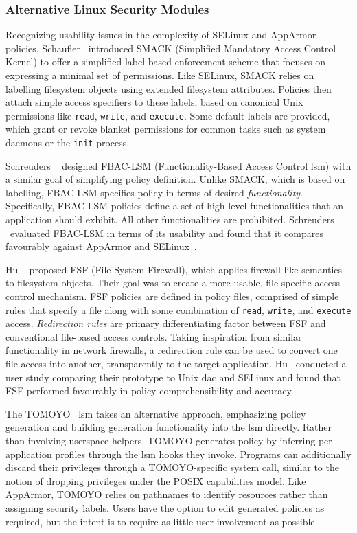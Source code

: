 \documentclass[
  fontsize=12pt,
  titlepage=firstiscover,
  paper=letter,
oneside,
  cleardoublepage=plain,
  parskip=half-,
  DIV=10,
  parindent,
  appendixprefix,
  chapterprefix,
  listof=totoc,
]{scrbook}
\begin{document}
\subsubsection*{Alternative Linux Security Modules}

Recognizing usability issues in the complexity of SELinux and AppArmor policies,
Schaufler~\cite{schaufler_smack} introduced SMACK (Simplified Mandatory Access Control
Kernel) to offer a simplified label-based enforcement scheme that focuses on expressing
a minimal set of permissions. Like SELinux, SMACK relies on labelling filesystem objects
using extended filesystem attributes. Policies then attach simple access specifiers to
these labels, based on canonical Unix permissions like \texttt{read}, \texttt{write}, and
\texttt{execute}. Some default labels are provided, which grant or revoke blanket
permissions for common tasks such as system daemons or the \texttt{init} process.

Schreuders \etal~\cite{schreuders2012_towards} designed FBAC-LSM (Functionality-Based
Access Control \gls{lsm}) with a similar goal of simplifying policy definition. Unlike
SMACK, which is based on labelling, FBAC-LSM specifies policy in terms of desired
\textit{functionality}. Specifically, FBAC-LSM policies define a set of high-level
functionalities that an application should exhibit. All other functionalities are
prohibited. Schreuders \etal~evaluated FBAC-LSM in terms of its usability and found that
it compares favourably against AppArmor and SELinux~\cite{schreuders2012_towards}.

Hu \etal~\cite{hu2013_fsf} proposed FSF (File System Firewall), which applies
firewall-like semantics to filesystem objects. Their goal was to create a more usable,
file-specific access control mechanism. FSF policies are defined in policy files,
comprised of simple rules that specify a file along with some combination of
\texttt{read}, \texttt{write}, and \texttt{execute} access. \textit{Redirection rules} are
primary differentiating factor between FSF and conventional file-based access controls.
Taking inspiration from similar functionality in network firewalls, a redirection rule can
be used to convert one file access into another, transparently to the target application.
Hu \etal~conducted a user study comparing their prototype to Unix \gls{dac} and SELinux
and found that FSF performed favourably in policy comprehensibility and accuracy.

The TOMOYO~\cite{harada2004_tomoyo} \gls{lsm} takes an alternative approach, emphasizing
policy generation and building generation functionality into the \gls{lsm} directly.
Rather than involving userspace helpers, TOMOYO generates policy by inferring
per-application profiles through the \gls{lsm} hooks they invoke. Programs can
additionally discard their privileges through a TOMOYO-specific system call, similar to
the notion of dropping privileges under the POSIX capabilities model. Like AppArmor,
TOMOYO relies on pathnames to identify resources rather than assigning security labels.
Users have the option to edit generated policies as required, but the intent is to require
as little user involvement as possible~\cite{harada2004_tomoyo}.
\end{document}

